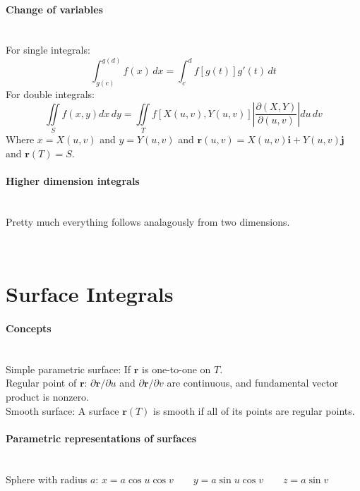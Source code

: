 \documentclass[10pt]{article}
\newcommand{\bs}[1]{\pmb{#1}}
\begin{document}
\paragraph{Change of variables}\ \\
For single integrals:
\begin{equation*}
\int_{g(c)}^{g(d)} f(x)\,dx = \int_c^d f[g(t)]g'(t)\,dt
\end{equation*}
For double integrals:
\begin{equation*}
\iint\limits_S f(x,y)dx\,dy = \iint\limits_T f[X(u,v),Y(u,v)] \left| \frac{\partial(X,Y)}{\partial(u,v)} \right| du\,dv
\end{equation*}
Where $x = X(u,v)$ and $y = Y(u,v)$ and $\bs{r}(u,v) = X(u,v)\bs{i} + Y(u,v)\bs{j}$ and $\bs{r}(T) = S$.

\paragraph{Higher dimension integrals}\ \\
Pretty much everything follows analagously from two dimensions.



\bigskip\bigskip\
\section{Surface Integrals}\smallskip

\paragraph{Concepts}\ \\
Simple parametric surface: If $\bs{r}$ is one-to-one on $T$.\\
Regular point of $\bs{r}$: $\partial\bs{r}/\partial u$ and $\partial\bs{r}/\partial v$ are continuous, and fundamental vector product is nonzero.\\
Smooth surface: A surface $\bs{r}(T)$ is smooth if all of its points are regular points.

\paragraph{Parametric representations of surfaces}\ \\
Sphere with radius $a$: $x=a\cos u\cos v \qquad y = a\sin u\cos v \qquad z = a \sin v$
\end{document}
